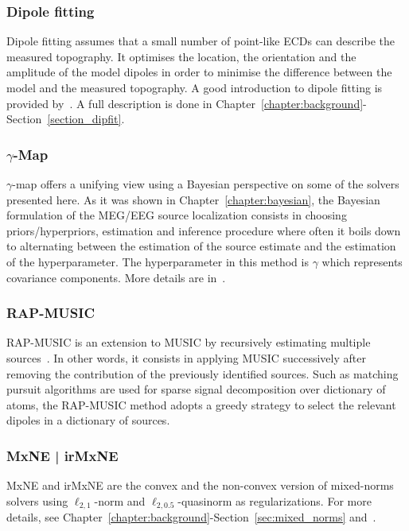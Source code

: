 \subsubsection{Dipole fitting}
Dipole fitting assumes that a small number of point-like \ac{ECD}s can describe the measured topography. It optimises the location, the orientation and the amplitude of the model dipoles in order to minimise the difference between the model and the measured topography. A good introduction to dipole fitting is provided by~\cite{scherg1990fundamentals}. A full description is done in Chapter~\ref{chapter:background}-Section~\ref{section_dipfit}.

\subsubsection{$\gamma$-Map}
$\gamma$-map offers a unifying view using a Bayesian perspective on some of the solvers presented here. As it was shown in Chapter~\ref{chapter:bayesian}, the Bayesian formulation of the MEG/EEG source localization consists in choosing priors/hyperpriors, estimation and inference procedure where often it boils down to alternating between the estimation of the source estimate and the estimation of the hyperparameter. The hyperparameter in this method is $\gamma$ which represents covariance components. More details are in~\cite{Wipf-Nagarajan:2009}.

\subsubsection{RAP-MUSIC}
\Ac{RAP-MUSIC} is an extension to \ac{MUSIC} by recursively estimating multiple sources~\cite{mosher1997source,mosher1999source}. In other words, it consists in applying MUSIC successively after removing the contribution of the previously identified sources. Such as matching pursuit algorithms are used for sparse signal decomposition over dictionary of atoms, the RAP-MUSIC method adopts a greedy strategy to select the relevant dipoles in a dictionary of sources.

\subsubsection{MxNE | irMxNE}
\Ac{MxNE} and \ac{irMxNE} are the convex and the non-convex version of mixed-norms solvers using $\ell_{2,1}$-norm and $\ell_{2,0.5}$-quasinorm as regularizations. For more details, see Chapter~\ref{chapter:background}-Section~\ref{sec:mixed_norms} and~\cite{gramfort2012mixed,strohmeier-etal:16}.

